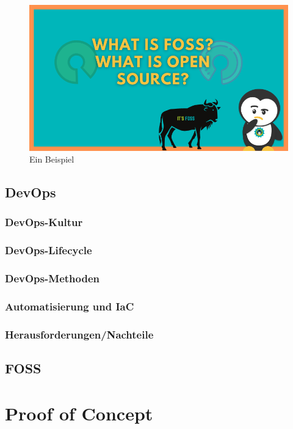 \documentclass[12pt,titlepage]{article}
\begin{document}
\begin{figure}[h]
    \centering
    \includegraphics[scale=0.7]{Bilder/what-is-foss}
    \caption{Ein Beispiel}
\end{figure}

\subsection{DevOps}



\subsubsection{DevOps-Kultur}



\subsubsection{DevOps-Lifecycle}



\subsubsection{DevOps-Methoden}



\subsubsection{Automatisierung und IaC}



\subsubsection{Herausforderungen/Nachteile}



\subsection{FOSS}



\section{Proof of Concept}


\end{document}
